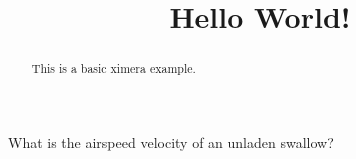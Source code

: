 \documentclass{ximera}
\begin{document}
\title[Hello]{Hello World!}
\begin{abstract}
This is a basic ximera example.
\end{abstract}
\maketitle

\begin{question}
What is the airspeed velocity of an unladen swallow? 
\end{question}
\end{document}
